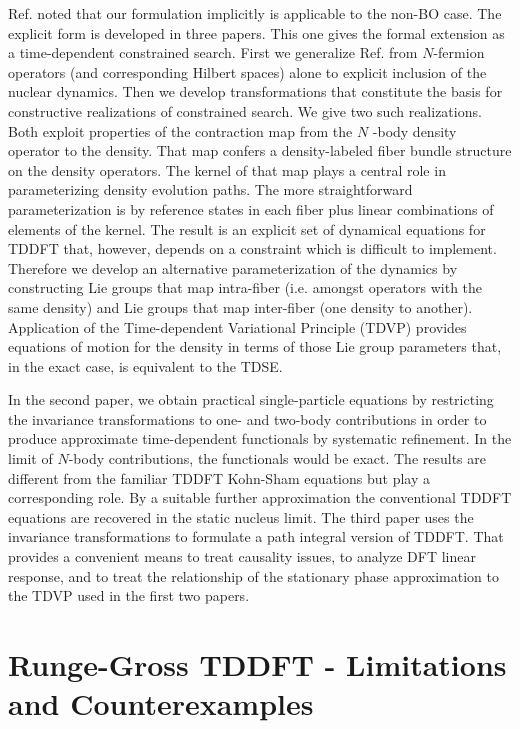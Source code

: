 Ref.  noted that our formulation implicitly is applicable
to the non-BO case. The explicit form is developed in three papers. This one
gives the formal extension as a time-dependent constrained search. First we
generalize Ref.  from $N$-fermion operators
(and corresponding Hilbert spaces) alone to explicit inclusion of the
nuclear dynamics. Then we develop transformations that constitute the basis
for constructive realizations of constrained search. We give two such
realizations. Both exploit properties of the contraction map from the $N$%
-body density operator to the density. That map confers a density-labeled
fiber bundle structure on the density operators. The kernel of that map
plays a central role in parameterizing density evolution paths. The more
straightforward parameterization is by reference states in each fiber plus
linear combinations of elements of the kernel. The result is an explicit set
of dynamical equations for TDDFT that, however, depends on a constraint
which is difficult to implement. Therefore we develop an alternative
parameterization of the dynamics by constructing Lie groups that map
intra-fiber (i.e. amongst operators with the same density) and Lie groups
that map inter-fiber (one density to another). Application of the
Time-dependent Variational Principle (TDVP) provides equations of motion for
the density in terms of those Lie group parameters that, in the exact case,
is equivalent to the TDSE.

In the second paper, we obtain practical single-particle equations by
restricting the invariance transformations to one- and two-body
contributions in order to produce approximate time-dependent functionals by
systematic refinement. In the limit of $N$-body contributions, the
functionals would be exact. The results are different from the familiar
TDDFT Kohn-Sham equations but play a corresponding role. By a suitable
further approximation the conventional TDDFT equations are recovered in the
static nucleus limit. The third paper uses the invariance transformations to
formulate a path integral version of TDDFT. That provides a convenient means
to treat causality issues, to analyze DFT linear response, and to treat the
relationship of the stationary phase approximation to the TDVP used in the
first two papers.

\section{Runge-Gross TDDFT - Limitations and Counterexamples}

